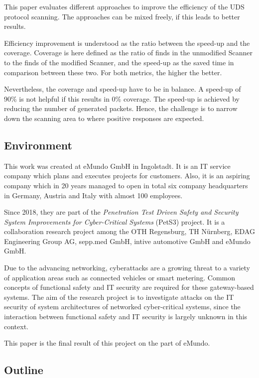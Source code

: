 This paper evaluates different approaches to improve the efficiency of the UDS protocol scanning. The approaches can be mixed freely, if this leads to better results.

Efficiency improvement is understood as the ratio between the speed-up and the coverage. Coverage is here defined as the ratio of finds in the unmodified Scanner to the finds of the modified Scanner, and the speed-up as the saved time in comparison between these two. For both metrics, the higher the better.

Nevertheless, the coverage and speed-up have to be in balance. A speed-up of 90\% is not helpful if this results in 0\% coverage. The speed-up is achieved by reducing the number of generated packets. Hence, the challenge is to narrow down the scanning area to where positive responses are expected.


\subsection{Environment}
This work was created at eMundo GmbH in Ingolstadt. It is an IT service company which plans and executes projects for customers. Also, it is an aspiring company which in 20 years managed to open in total six company headquarters in Germany, Austria and Italy with almost 100 employees.

Since 2018, they are part of the \emph{Penetration Test Driven Safety and Security System Improvements for Cyber-Critical Systems} (PetS3) project. It is a collaboration research project among the OTH Regensburg, TH Nürnberg, EDAG Engineering Group AG, sepp.med GmbH, intive automotive GmbH and eMundo GmbH.

Due to the advancing networking, cyberattacks are a growing threat to a variety of application areas such as connected vehicles or smart metering. Common concepts of functional safety and IT security are required for these gateway-based systems. The aim of the research project is to investigate attacks on the IT security of system architectures of networked cyber-critical systems, since the interaction between functional safety and IT security is largely unknown in this context.

This paper is the final result of this project on the part of eMundo.

\subsection{Outline}
